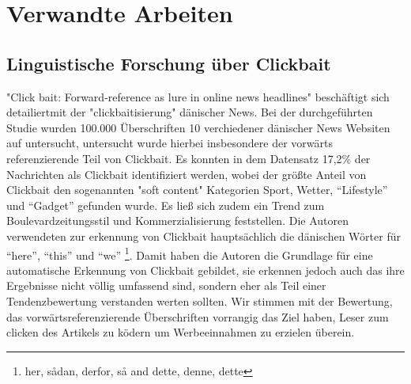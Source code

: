 \chapter{Verwandte Arbeiten} %
\label{cha:verwandte_arbeit}

\section{Linguistische Forschung über Clickbait} %
\label{sub:section_name}
"Click bait: Forward-reference as lure in online news
headlines" \cite{blom2015click} beschäftigt sich detailiertmit der "clickbaitisierung" dänischer News. 
Bei der durchgeführten Studie wurden 100.000 Überschriften 10 verchiedener dänischer News Websiten auf untersucht, untersucht wurde hierbei insbesondere der vorwärts referenzierende Teil von Clickbait.
Es konnten in dem Datensatz 17,2\% der Nachrichten als Clickbait identifiziert werden, wobei der größte Anteil von Clickbait den  sogenannten "soft content" Kategorien Sport, Wetter, \enquote{Lifestyle} und \enquote{Gadget} gefunden wurde. Es ließ sich zudem ein Trend zum Boulevardzeitungsstil und Kommerzialisierung feststellen.
Die Autoren verwendeten zur erkennung von Clickbait hauptsächlich die dänischen Wörter für \enquote{here}, \enquote{this} und \enquote{we} \footnote{her, sådan, derfor, så and dette, denne, dette}.
Damit haben die Autoren die Grundlage für eine automatische Erkennung von Clickbait gebildet, sie erkennen jedoch auch das ihre Ergebnisse nicht völlig  umfassend sind, sondern eher als Teil einer Tendenzbewertung verstanden werten sollten.
Wir stimmen mit der Bewertung, das vorwärtsreferenzierende Überschriften vorrangig das Ziel haben, Leser zum clicken des Artikels zu ködern um Werbeeinnahmen zu erzielen überein.

